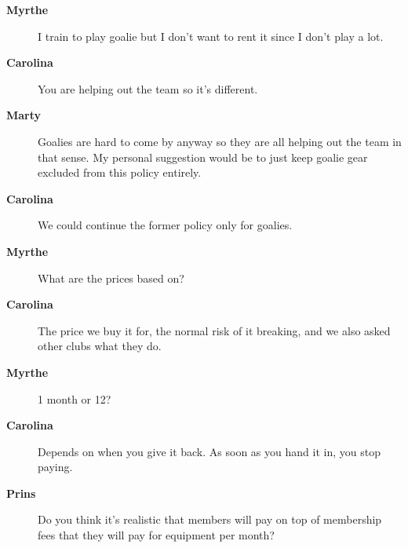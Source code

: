 \documentclass[12pt, a4paper]{article}
\newcommand{\speak}[2]{\begin{description}\item[\textbf{#1}]#2\end{description}}
\begin{document}



\speak{Myrthe}{I train to play goalie but I don't want to rent it since I don't play a lot.}

\speak{Carolina}{You are helping out the team so it's different.}

\speak{Marty}{Goalies are hard to come by anyway so they are all helping out the team in that sense. My personal suggestion would be to just keep goalie gear excluded from this policy entirely.}

\speak{Carolina}{We could continue the former policy only for goalies.}


\speak{Myrthe}{What are the prices based on?}

\speak{Carolina}{The price we buy it for, the normal risk of it breaking, and we also asked other clubs what they do.}



\speak{Myrthe}{1 month or 12?}

\speak{Carolina}{Depends on when you give it back. As soon as you hand it in, you stop paying.}







\speak{Prins}{Do you think it's realistic that members will pay on top of membership fees that they will pay for equipment per month?}


\end{document}
